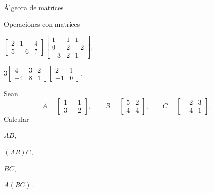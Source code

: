 \begin{chapter}{\'Algebra de matrices}
\begin{section}{Operaciones con matrices}
\begin{enumex}
\begin{enumex}
                \begin{minipage}{0.45\textwidth}
                    \item $\begin{bmatrix} 2&1&4\\5&-6&7 \end{bmatrix}
                    \begin{bmatrix} 1&1&1\\0&2&-2\\-3&2&1 \end{bmatrix}$,
                \end{minipage}
                \begin{minipage}{0.4\textwidth}
                    \item $3 \begin{bmatrix}
                        4&3&2\\-4&8&1
                    \end{bmatrix}\begin{bmatrix}
                        2&1\\-1&0
                    \end{bmatrix}$. 
                \end{minipage}
                \end{enumex}

            \item Sean
            $$
            A= \begin{bmatrix} 1&-1\\ 3&-2 \end{bmatrix},\qquad
            B= \begin{bmatrix} 5&2\\ 4&4 \end{bmatrix},\qquad
            C= \begin{bmatrix} -2&3\\ -4&1 \end{bmatrix}.
            $$
            Calcular 
                \begin{enumex}
                    \begin{minipage}{0.2\textwidth}
                    \item $AB$, \end{minipage}
                    \begin{minipage}{0.2\textwidth}
                    \item $(AB)C$,\end{minipage}
                    \begin{minipage}{0.2\textwidth}
                    \item $BC$,\end{minipage}
                    \begin{minipage}{0.2\textwidth}
                    \item $A(BC)$.\end{minipage}
                \end{enumex}


\end{enumex}
\end{section}
\end{chapter}
